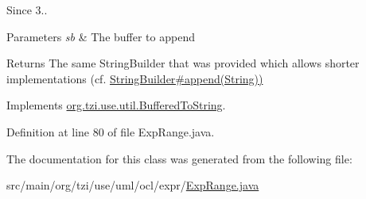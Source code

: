 \begin{DoxySince}{Since}
3.. 
\end{DoxySince}

\begin{DoxyParams}{Parameters}
{\em sb} & The buffer to append \\
\hline
\end{DoxyParams}
\begin{DoxyReturn}{Returns}
The same String\-Builder that was provided which allows shorter implementations (cf. \hyperlink{}{String\-Builder\#append(\-String))} 
\end{DoxyReturn}


Implements \hyperlink{interfaceorg_1_1tzi_1_1use_1_1util_1_1_buffered_to_string_aea95e4e53b18818d50ee253700e6e2d5}{org.\-tzi.\-use.\-util.\-Buffered\-To\-String}.



Definition at line 80 of file Exp\-Range.\-java.



The documentation for this class was generated from the following file\-:\begin{DoxyCompactItemize}
\item 
src/main/org/tzi/use/uml/ocl/expr/\hyperlink{_exp_range_8java}{Exp\-Range.\-java}\end{DoxyCompactItemize}
